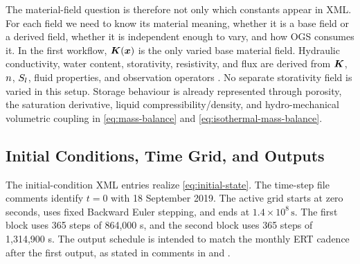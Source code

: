 

The material-field question is therefore not only which constants appear in XML.
For each field we need to know its material meaning, whether it is a base field or a
derived field, whether it is independent enough to vary, and how OGS consumes it.
In the first workflow, \(\bm{K}(\bm{x})\) is the only varied base material field.
Hydraulic conductivity, water content, storativity, resistivity, and flux are
derived from \(\bm{K}\), \(n\), \(S_l\), fluid properties, and observation
operators \citep[Darcy law and effective-storage equation]{OpenGeoSysTRMDocs}
\citep[Sec.~3, Eq.~3]{WaterContentEDZ2024}.
No separate storativity field is varied in this setup.  Storage behaviour is
already represented through porosity, the saturation derivative, liquid
compressibility/density, and hydro-mechanical volumetric coupling in
\eqref{eq:mass-balance} and \eqref{eq:isothermal-mass-balance}.

\subsection{Initial Conditions, Time Grid, and Outputs}
\label{sec:initial-time-output}

The initial-condition XML entries realize \eqref{eq:initial-state}.  The time-step
file comments identify \(t=0\) with 18 September 2019.  The active grid starts at
zero seconds, uses fixed Backward Euler stepping, and ends at
\(1.4\times10^8\,\mathrm{s}\).  The first block uses 365 steps of 864,000 s, and
the second block uses 365 steps of 1,314,900 s.  The output schedule is intended to
match the monthly ERT cadence after the first output, as stated in comments in
 and .



